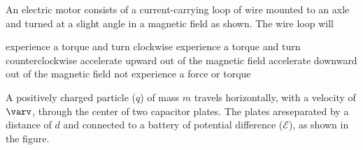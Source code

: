 \documentclass{../../../oss-ap12ibhl}
\begin{document}
\begin{questions}
  \question An electric motor consists of a current-carrying loop of wire
  mounted to an axle and turned at a slight angle in a magnetic field as shown.
  The wire loop will
  \begin{center}
  \end{center}
  \begin{choices}
    \choice experience a torque and turn clockwise
    \choice experience a torque and turn counterclockwise
    \choice accelerate upward out of the magnetic field
    \choice accelerate downward out of the magnetic field
    \choice not experience a force or torque
  \end{choices}
  \newpage


  \question A positively charged particle ($q$) of mass $m$ travels
  horizontally, with a velocity of $\varv$, through the center of two capacitor
  plates. The plates areseparated by a distance of $d$ and connected to a
  battery of potential difference ($\mathcal{E}$), as shown in the figure.
\end{questions}
\end{document}
